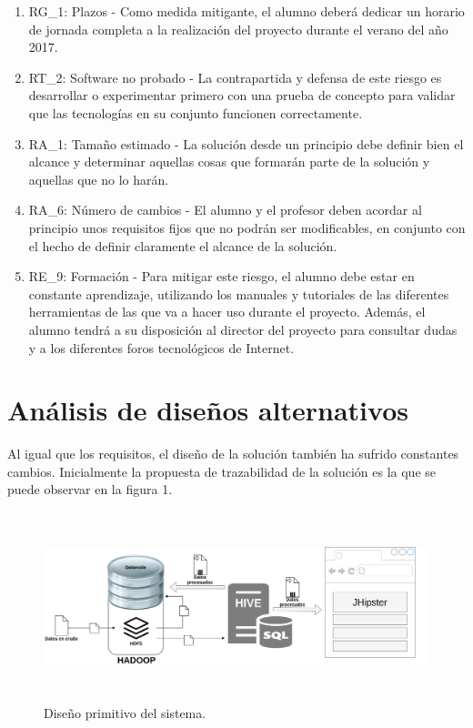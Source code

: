 \begin{enumerate}
\begin{enumerate}
\item RG\_1: Plazos - Como medida mitigante, el alumno deberá dedicar un horario de jornada completa a la realización del proyecto durante el verano del año 2017. 
\item RT\_2: Software no probado - La contrapartida y defensa de este riesgo es desarrollar o experimentar primero con una prueba de concepto para validar que las tecnologías en su conjunto funcionen correctamente. 
\item RA\_1: Tamaño estimado - La solución desde un principio debe definir bien el alcance y determinar aquellas cosas que formarán parte de la solución y aquellas que no lo harán. 
\item RA\_6: Número de cambios - El alumno y el profesor deben acordar al principio unos requisitos fijos que no podrán ser modificables, en conjunto con el hecho de definir claramente el alcance de la solución.
\item RE\_9: Formación - Para mitigar este riesgo, el alumno debe estar en constante aprendizaje, utilizando los manuales y tutoriales de las diferentes herramientas de las que va a hacer uso durante el proyecto. Además, el alumno tendrá a su disposición al director del proyecto para consultar dudas y a los diferentes foros tecnológicos de Internet. 
\end{enumerate}
\end{enumerate}

\section{Análisis de diseños alternativos} \label{c.analisis.disenyos}

Al igual que los requisitos, el diseño de la solución también ha sufrido constantes cambios. Inicialmente la propuesta de trazabilidad de la solución es la que se puede observar en la figura 1. \par

\begin{figure}[H]
    \centering
    \includegraphics[width=1\textwidth,height=5.5cm]{Imagenes/Dis_Fig_1}
    \caption{Diseño primitivo del sistema.}
    \label{fig:dis_1_sist}
\end{figure}
\par


